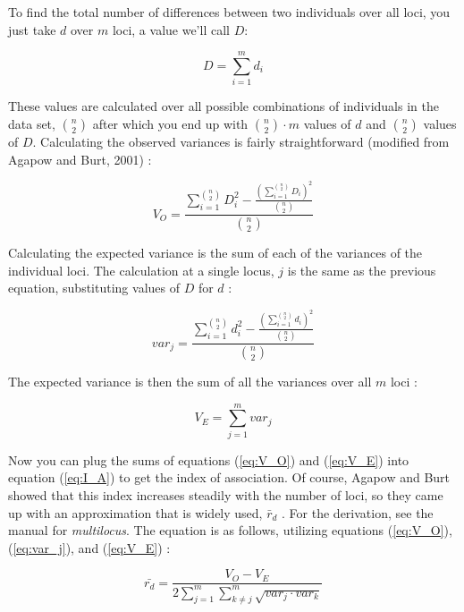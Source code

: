 \documentclass[letterpaper]{article}\usepackage[]{graphicx}\usepackage[]{color}
\begin{document}
To find the total number of differences between two individuals over all loci, you just take $d$ over $m$ loci, a value we'll call $D$:

\begin{equation}
\label{eq:ia_D}
D = \displaystyle \sum_{i=1}^{m} d_i
\end{equation}

These values are calculated over all possible combinations of individuals in the data set, ${n \choose 2}$ after which you end up with ${n \choose 2}\cdot{}m$ values of $d$ and ${n \choose 2}$ values of $D$.
Calculating the observed variances is fairly straightforward (modified from Agapow and Burt, 2001) \cite{Agapow:2001}:

\begin{equation}
\label{eq:V_O}
V_O = \frac{\displaystyle \sum_{i=1}^{n \choose 2} D_{i}^2 - \frac{(\displaystyle\sum_{i=1}^{n \choose 2} D_{i})^2}{{n \choose 2}}}{{n \choose 2}}
\end{equation}

Calculating the expected variance is the sum of each of the variances of the individual loci. The calculation at a single locus, $j$ is the same as the previous equation, substituting values of $D$ for $d$ \cite{Agapow:2001}:

\begin{equation}
\label{eq:var_j}
var_j = \frac{\displaystyle \sum_{i=1}^{n \choose 2} d_{i}^2 - \frac{(\displaystyle\sum_{i=1}^{n \choose 2} d_i)^2}{{n \choose 2}}}{{n \choose 2}}
\end{equation}

The expected variance is then the sum of all the variances over all $m$ loci \cite{Agapow:2001}:

\begin{equation}
\label{eq:V_E}
V_E = \displaystyle \sum_{j=1}^{m} var_j
\end{equation}

Now you can plug the sums of equations (\ref{eq:V_O}) and (\ref{eq:V_E}) into equation (\ref{eq:I_A}) to get the index of association.
Of course, Agapow and Burt showed that this index increases steadily with the number of loci, so they came up with an approximation that is widely used, $\bar r_d$ \cite{Agapow:2001}. For the derivation, see the manual for \textit{multilocus}. The equation is as follows, utilizing equations (\ref{eq:V_O}), (\ref{eq:var_j}), and (\ref{eq:V_E}) \cite{Agapow:2001}:

\begin{equation}
\label{eq:r_d}
\bar{r_d} = \frac{V_O - V_E}
{2\displaystyle \sum_{j=1}^{m}\displaystyle \sum_{k \neq j}^{m}\sqrt{var_j\cdot{}var_k}}
\end{equation}
\end{document}
